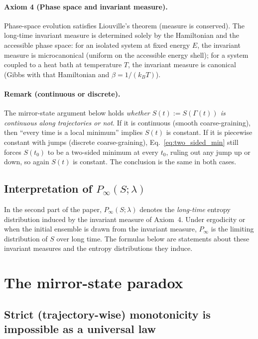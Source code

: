 \documentclass[11pt,a4paper]{article}
\begin{document}
\paragraph{Axiom 4 (Phase space and invariant measure).}
Phase-space evolution satisfies Liouville's theorem (measure is conserved). The
long-time invariant measure is determined solely by the Hamiltonian and the
accessible phase space: for an isolated system at fixed energy $E$, the invariant
measure is microcanonical (uniform on the accessible energy shell); for a system
coupled to a heat bath at temperature $T$, the invariant measure is canonical
(Gibbs with that Hamiltonian and $\beta=1/(k_B T)$).

\paragraph{Remark (continuous or discrete).}
\label{sec:continuity}
The mirror-state argument below holds \emph{whether $S(t):=S(\Gamma(t))$ is
continuous along trajectories or not}. If it is continuous (smooth
coarse-graining), then ``every time is a local minimum'' implies $S(t)$ is
constant. If it is piecewise constant with jumps (discrete coarse-graining),
Eq.~\eqref{eq:two_sided_min} still forces $S(t_0)$ to be a two-sided minimum at
every $t_0$, ruling out any jump up or down, so again $S(t)$ is constant. The
conclusion is the same in both cases.

\subsection{Interpretation of $P_{\infty}(S;\lambda)$}
\label{sec:Pinf_meaning}

In the second part of the paper, $P_{\infty}(S;\lambda)$ denotes the
\emph{long-time} entropy distribution induced by the invariant measure of Axiom~4.
Under ergodicity or when the initial ensemble is drawn from the invariant measure,
$P_{\infty}$ is the limiting distribution of $S$ over long time. The formulas
below are statements about these invariant measures and the entropy
distributions they induce.

\section{The mirror-state paradox}
\label{sec:paradox}

\subsection{Strict (trajectory-wise) monotonicity is impossible as a universal law}
\end{document}
